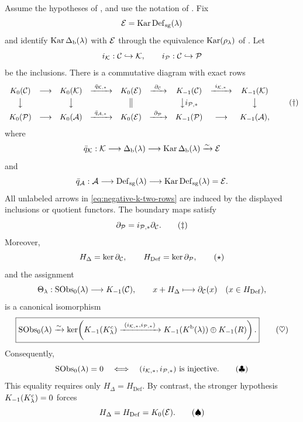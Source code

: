 \begin{theorem}\label{thm:negative-k-obstruction}
Assume the hypotheses of , and use the notation of .  Fix
\[
 \mathcal E=\operatorname{Kar}\operatorname{Def}_{\mathrm{sg}}(\lambda)
\]
and identify \(\operatorname{Kar}\Delta_{\mathrm b}(\lambda)\) with \(\mathcal E\) through the equivalence \(\operatorname{Kar}(\rho_\lambda)\) of .  Let
\[
 i_{\mathcal K}:\mathcal C\hookrightarrow\mathcal K,
 \qquad
 i_{\mathcal P}:\mathcal C\hookrightarrow\mathcal P
\]
be the inclusions.  There is a commutative diagram with exact rows
\[
\begin{array}{ccccccccc}
 K_0(\cC)&\longrightarrow&K_0(\cK)&\xrightarrow{\ \bar q_{\cK,*}\ }&K_0(\cE)&\xrightarrow{\ \partial_{\cC}\ }&K_{-1}(\cC)&\xrightarrow{\ i_{\cK,*}\ }&K_{-1}(\cK)\\[1mm]
 \big\downarrow&&\big\downarrow&&\big\Vert&&\big\downarrow i_{\cP,*}&&\big\downarrow\\[1mm]
 K_0(\cP)&\longrightarrow&K_0(\cA)&\xrightarrow{\ \bar q_{\cA,*}\ }&K_0(\cE)&\xrightarrow{\ \partial_{\cP}\ }&K_{-1}(\cP)&\longrightarrow&K_{-1}(\cA),
\end{array}
\tag{\(\dagger\)}\label{eq:negative-k-two-rows}
\]
where
\[
 \bar q_{\mathcal K}:\mathcal K\longrightarrow\Delta_{\mathrm b}(\lambda)
 \longrightarrow\operatorname{Kar}\Delta_{\mathrm b}(\lambda)\xrightarrow{\sim}\mathcal E
\]
and
\[
 \bar q_{\mathcal A}:\mathcal A\longrightarrow\operatorname{Def}_{\mathrm{sg}}(\lambda)
 \longrightarrow\operatorname{Kar}\operatorname{Def}_{\mathrm{sg}}(\lambda)=\mathcal E.
\]
All unlabeled arrows in \eqref{eq:negative-k-two-rows} are induced by the displayed inclusions or quotient functors.  The boundary maps satisfy
\[
 \partial_{\mathcal P}=i_{\mathcal P,*}\partial_{\mathcal C}.
\tag{\(\ddagger\)}\label{eq:boundary-naturality}
\]
Moreover,
\[
 H_\Delta=\ker\partial_{\mathcal C},
 \qquad
 H_{\mathrm{Def}}=\ker\partial_{\mathcal P},
\tag{\(\star\)}\label{eq:H-as-boundary-kernels}
\]
and the assignment
\[
 \Theta_\lambda:
 \operatorname{SObs}_0(\lambda)\longrightarrow K_{-1}(\mathcal C),
 \qquad
 x+H_\Delta\longmapsto\partial_{\mathcal C}(x)\quad(x\in H_{\mathrm{Def}}),
\]
is a canonical isomorphism
\[
 \boxed{
 \operatorname{SObs}_0(\lambda)
 \xrightarrow{\sim}
 \ker\!\left(
 K_{-1}(K^c_\lambda)
 \xrightarrow{\ (i_{\mathcal K,*},i_{\mathcal P,*})\ }
 K_{-1}(K^{\mathrm b}(\lambda))\oplus K_{-1}(R)
 \right).}
\tag{\(\heartsuit\)}\label{eq:sobs-negative-k}
\]
Consequently,
\[
 \operatorname{SObs}_0(\lambda)=0
 \quad\Longleftrightarrow\quad
 (i_{\mathcal K,*},i_{\mathcal P,*})\text{ is injective}.
\tag{\(\clubsuit\)}\label{eq:sobs-injectivity}
\]
This equality requires only \(H_\Delta=H_{\mathrm{Def}}\).  By contrast, the stronger hypothesis \(K_{-1}(K^c_\lambda)=0\) forces
\[
 H_\Delta=H_{\mathrm{Def}}=K_0(\mathcal E).
\tag{\(\spadesuit\)}\label{eq:stronger-k0-density}
\]
\end{theorem}

